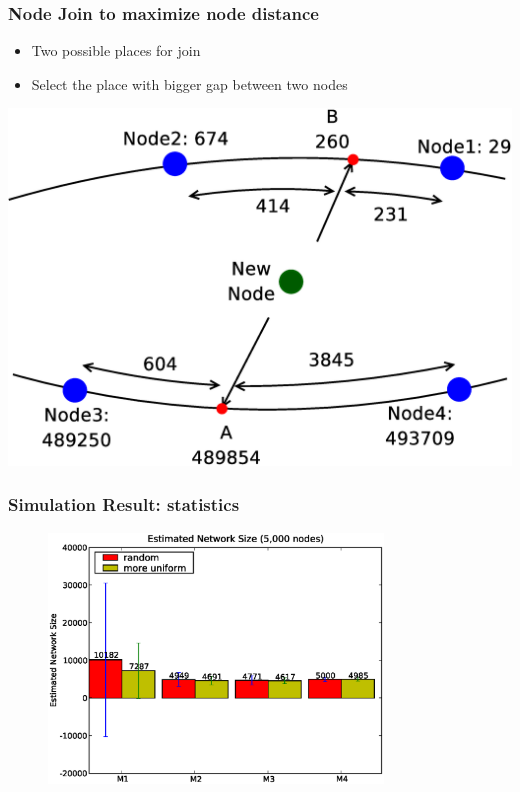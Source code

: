 \documentclass[red]{beamer}
\begin{document}
\begin{frame}
\frametitle{Node Join to maximize node distance}
\begin{itemize}
\item Two possible places for join 
\item Select the place with bigger gap between two nodes
\end{itemize}
\center
\includegraphics[angle=0,scale=0.2]{figs/evenNet}

\end{frame}
\begin{frame}
\frametitle{Simulation Result: statistics}
\begin{figure}
\centering
\includegraphics[width=3.5in]{figs/size5k}
\end{figure}
\end{frame}
\end{document}

